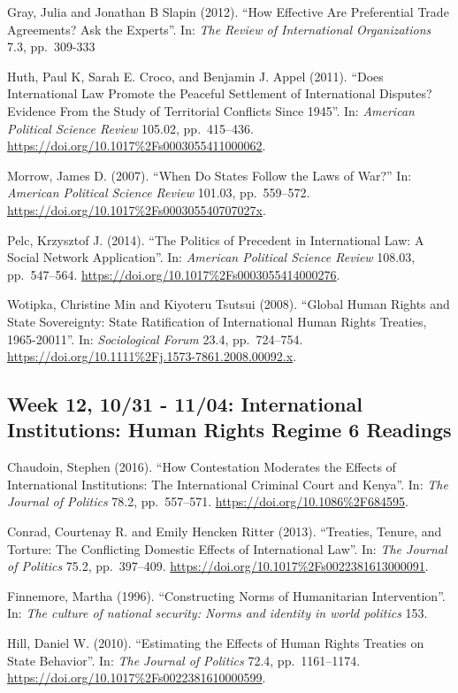 \documentclass[10pt,]{article}
\begin{document}
Gray, Julia and Jonathan B Slapin (2012). ``How Effective Are
Preferential Trade Agreements? Ask the Experts''. In:
\emph{The Review of International Organizations} 7.3, pp.~309-333

Huth, Paul K, Sarah E. Croco, and Benjamin J. Appel (2011). ``Does
International Law Promote the Peaceful Settlement of International
Disputes? Evidence From the Study of Territorial Conflicts Since 1945''.
In: \emph{American Political Science Review} 105.02, pp.~415--436.
\url{https://doi.org/10.1017\%2Fs0003055411000062}.

Morrow, James D. (2007). ``When Do States Follow the Laws of War?'' In:
\emph{American Political Science Review} 101.03, pp.~559--572.
\url{https://doi.org/10.1017\%2Fs000305540707027x}.

Pelc, Krzysztof J. (2014). ``The Politics of Precedent in International
Law: A Social Network Application''. In:
\emph{American Political Science Review} 108.03, pp.~547--564.
\url{https://doi.org/10.1017\%2Fs0003055414000276}.

Wotipka, Christine Min and Kiyoteru Tsutsui (2008). ``Global Human
Rights and State Sovereignty: State Ratification of International Human
Rights Treaties, 1965-20011''. In: \emph{Sociological Forum} 23.4,
pp.~724--754. \url{https://doi.org/10.1111\%2Fj.1573-7861.2008.00092.x}.

\subsection{Week 12, 10/31 - 11/04: International Institutions: Human
Rights Regime \textbar{} 6
Readings}\label{week-12-1031---1104-international-institutions-human-rights-regime-6-readings}

Chaudoin, Stephen (2016). ``How Contestation Moderates the Effects of
International Institutions: The International Criminal Court and
Kenya''. In: \emph{The Journal of Politics} 78.2, pp.~557--571.
\url{https://doi.org/10.1086\%2F684595}.

Conrad, Courtenay R. and Emily Hencken Ritter (2013). ``Treaties,
Tenure, and Torture: The Conflicting Domestic Effects of International
Law''. In: \emph{The Journal of Politics} 75.2, pp.~397--409.
\url{https://doi.org/10.1017\%2Fs0022381613000091}.

Finnemore, Martha (1996). ``Constructing Norms of Humanitarian
Intervention''. In:
\emph{The culture of national security: Norms and identity in world politics}
153.

Hill, Daniel W. (2010). ``Estimating the Effects of Human Rights
Treaties on State Behavior''. In: \emph{The Journal of Politics} 72.4,
pp.~1161--1174. \url{https://doi.org/10.1017\%2Fs0022381610000599}.
\end{document}
